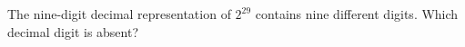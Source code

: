 The nine-digit decimal representation of $2^{29}$ contains nine different digits. Which decimal digit is absent?
